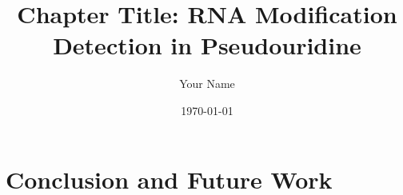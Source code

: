 \documentclass[12pt]{book}
\begin{document}
  \title{Chapter Title: RNA Modification Detection in Pseudouridine}
  \author{Your Name}
  \date{\today}

  \maketitle

  \tableofcontents
  \newpage


  
  
  

  \chapter{Conclusion and Future Work}
  \label{ch:conclusion}

  
\end{document}
